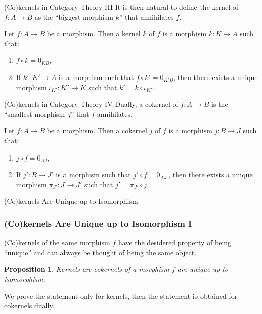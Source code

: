 \documentclass{beamer}
\newtheorem{proposition}{Proposition}
\begin{document}
\begin{frame}{(Co)kernels in Category Theory III}
    It is then natural to define the kernel of $f : A \to B$ as the ``biggest morphism $k$''
    that annihilates $f$. \medskip

    \begin{definition}
        Let $f : A \to B$ be a morphism. Then a kernel $k$ of $f$ is a morphism
        $k : K \to A$ such that:
        \begin{enumerate}
            \item $f \circ k = 0_{KB}$,
            \item If $k' : K' \to A$ is a morphism such that $f \circ k' = 0_{K'B}$, then
                there exists a unique morphism $\iota_{K'} : K' \to K$ such that
                $k' = k \circ \iota_{K'}$.
        \end{enumerate}
    \end{definition}
\end{frame}

\begin{frame}{(Co)kernels in Category Theory IV}
    Dually, a cokernel of $f : A \to B$ is the ``smallest morphism $j$'' that
    $f$ annihilates. \medskip

    \begin{definition}
        Let $f : A \to B$ be a morphism. Then a cokernel $j$ of $f$ is a morphism
        $j : B \to J$ such that:
        \begin{enumerate}
            \item $j \circ f = 0_{AJ}$,
            \item If $j' : B \to J'$ is a morphism such that $j' \circ f = 0_{AJ'}$, then
                there exists a unique morphism $\pi_{J'} : J \to J'$ such that
                $j' = \pi_{J'} \circ j$.
        \end{enumerate}
    \end{definition}
\end{frame}

\begin{frame}{(Co)kernels Are Unique up to Isomorphism}
    \frametitle{(Co)kernels Are Unique up to Isomorphism I}
    (Co)kernels of the same morphism $f$
    have the desidered property of being ``unique'' and can always be thought
    of being the same object. \medskip

    \begin{proposition}
        \label{prop:kernels_unique_up_to_iso}
        Kernels are cokernels of a morphism $f$ are unique up to isomorphism.
    \end{proposition}

    We prove the statement only for kernels, then the statement is obtained for
    cokernels dually. \medskip
\end{frame}
\end{document}
